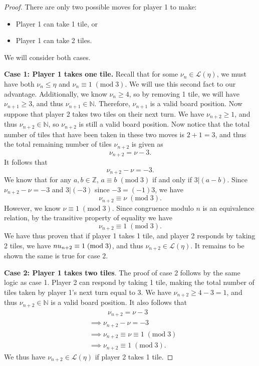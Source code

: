 \documentclass[11pt, letterpaper]{article}
\renewcommand{\mod}[1]{\;(\text{mod}\;#1)}
\begin{document}
\begin{proof}
	There are only two possible moves for player 1 to make:
	\begin{itemize}
		\item Player 1 can take 1 tile, or
		\item Player 1 can take 2 tiles.
	\end{itemize}
	We will consider both cases.

	\textbf{Case 1: Player 1 takes one tile.} Recall that for some $\nu_n\in\mathcal{L} (\eta )$, we must have both $\nu_n \leq \eta $ and $\nu _n \equiv 1\mod{3}$. We will use this second fact to our advantage. Additionally, we know $\nu_n\geq 4$, so by removing 1 tile, we will have $\nu _{n+1}\geq 3$, and thus $\nu _{n+1}\in\mathbb{N}$. Therefore, $\nu _{n+1}$ is a valid board position. Now suppose that player 2 takes two tiles on their next turn. We have $\nu _{n+2}\geq 1$, and thus $\nu _{n+2}\in\mathbb{N}$, so $\nu _{n+2}$ is still a valid board position. Now notice that the total number of tiles that have been taken in these two moves is $2+1=3$, and thus the total remaining number of tiles $\nu _{n+2}$ is given as
	\[
		\nu _{n+2}=\nu -3
	.\]
	It follows that
	\[
		\nu _{n+2}-\nu =-3
	.\]
	We know that for any $a,b\in\mathbb{Z}$, $a\equiv b\mod{3}$ if and only if $3|(a-b)$. Since $\nu _{n+2}-\nu =-3$ and $3|(-3)$ since $-3=(-1)3$, we have
	\[
	\nu _{n+2}\equiv \nu \mod{3}
	.\]
	However, we know $\nu \equiv 1\mod{3}$. Since congruence modulo $n$ is an equivalence relation, by the transitive property of equality we have
	\[
		\nu _{n+2}\equiv 1\mod{3}
	.\]
	We have thus proven that if player 1 takes 1 tile, and player 2 responds by taking 2 tiles, we have $\\nu _{n+2}\equiv 1\mod{3}$, and thus $\nu _{n+2}\in\mathcal{L} (\eta )$. It remains to be shown the same is true for case 2.

	\textbf{Case 2: Player 1 takes two tiles}. The proof of case 2 follows by the same logic as case 1. Player 2 can respond by taking 1 tile, making the total number of tiles taken by player 1's next turn equal to 3. We have $\nu_{n+2}\geq 4-3=1$, and thus $\nu _{n+2}\in\mathbb{N}$ is a valid board position. It also follows that
	\begin{align*}
		&\qquad\,\,\,\, \nu _{n+2}=\nu -3\\
		&\implies \nu _{n+2}-\nu =-3\\
		&\implies \nu _{n+2}\equiv \nu \equiv 1\mod{3}\\
		&\implies \nu _{n+2}\equiv 1\mod{3}
	.\end{align*}
	We thus have $\nu _{n+2}\in\mathcal{L} (\eta )$ if player 2 takes 1 tile.
\end{proof}
\end{document}
